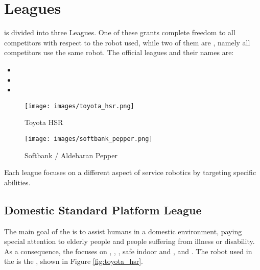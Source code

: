 \section{Leagues}
\label{sec:leagues}

\AtHome{} is divided into three Leagues. One of these grants complete freedom to all competitors with respect to the robot used, while two of them are \SPLs{}, namely all competitors use the same robot. The official leagues and their names are:
\begin{itemize}
  \item \OPL
  \item \DSPL
  \item \SSPL
\end{itemize}

\begin{wrapfigure}[21]{r}{0.30\textwidth}
	\vspace{-30pt}
	\begin{center}
		\texttt{[image: images/toyota\_hsr.png]}
		\vspace{-10pt}
		\caption{Toyota HSR}
		\label{fig:toyota_hsr}
	\end{center}

	\vspace{-20pt}
	\begin{center}
		\texttt{[image: images/softbank\_pepper.png]}
		\vspace{-10pt}
		\caption{Softbank / Aldebaran Pepper}
		\label{fig:softbank_pepper}
	\end{center}
\end{wrapfigure}
Each league focuses on a different aspect of service robotics by targeting specific abilities.

\subsection{Domestic Standard Platform League}

The main goal of the  is to assist humans in a domestic environment, paying special attention to elderly people and people suffering from illness or disability.
As a consequence, the  focuses on \AmI, \CV, \OM, safe indoor \NAV{} and \MAP, and \TP.
The robot used in the  is the \HSR, shown in Figure \ref{fig:toyota_hsr}.

